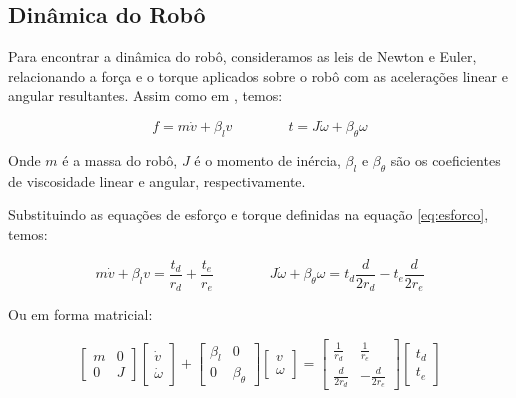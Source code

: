 \subsection{Dinâmica do Robô}

Para encontrar a dinâmica do robô, consideramos as leis de Newton e Euler,
relacionando a força e o torque aplicados sobre o robô com as acelerações linear e angular resultantes.
Assim como em \cite{vieira2005controle}, temos:

\begin{equation}
f = m \dot{v} + \beta_l v
\qquad
\qquad
t = J \dot{\omega} + \beta_{\theta} \omega
\end{equation}

Onde $m$ é a massa do robô, $J$ é o momento de inércia,
$\beta_l$ e $\beta_{\theta}$ são os coeficientes de viscosidade linear e angular, respectivamente.

Substituindo as equações de esforço e torque definidas na equação \ref{eq:esforco}, temos:

\begin{equation}
m \dot{v} + \beta_l v = \frac{t_d}{r_d} + \frac{t_e}{r_e}
\qquad
\qquad
J \dot{\omega} + \beta_{\theta} \omega = t_d \frac{d}{2r_d} - t_e \frac{d}{2r_e}
\end{equation}

Ou em forma matricial:

\begin{equation}
\begin{bmatrix}
m & 0 \\
0 & J
\end{bmatrix}
\begin{bmatrix}
\dot{v} \\
\dot{\omega}
\end{bmatrix}
+
\begin{bmatrix}
\beta_l & 0 \\
0 & \beta_{\theta}
\end{bmatrix}
\begin{bmatrix}
v \\
\omega
\end{bmatrix}
=
\begin{bmatrix}
\frac{1}{r_d} & \frac{1}{r_e} \\
\frac{d}{2r_d} & -\frac{d}{2r_e}
\end{bmatrix}
\begin{bmatrix}
t_d \\
t_e
\end{bmatrix}
\end{equation}

